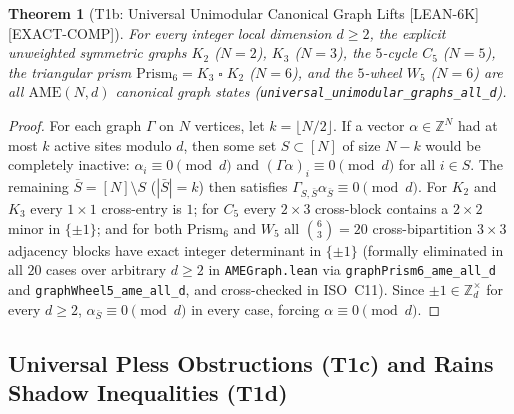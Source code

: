\documentclass[11pt,reqno]{amsart}
\newtheorem{theorem}{Theorem}[section]
\theoremstyle{definition}
\newcommand{\ZZ}{\mathbb{Z}}
\newcommand{\AME}{\mathrm{AME}}
\newcommand{\lid}[1]{{\footnotesize\nolinkurl{#1}}}
\newcommand{\tagL}{\textsf{\footnotesize[LEAN-6K]}}
\newcommand{\tagE}{\textsf{\footnotesize[EXACT-COMP]}}
\begin{document}
\begin{theorem}[T1b: Universal Unimodular Canonical Graph Lifts \tagL\,\tagE]
\label{thm:t1b}
For every integer local dimension $d \ge 2$, the explicit unweighted symmetric graphs
$K_2$ ($N=2$), $K_3$ ($N=3$), the $5$-cycle $C_5$ ($N=5$), the triangular prism
$\mathrm{Prism}_6 = K_3 \mathbin{\square} K_2$ ($N=6$), and the $5$-wheel $W_5$ ($N=6$)
are all $\AME(N, d)$ canonical graph states (\lid{universal_unimodular_graphs_all_d}).
\end{theorem}

\begin{proof}
For each graph $\Gamma$ on $N$ vertices, let $k = \lfloor N/2 \rfloor$. If a vector
$\alpha \in \ZZ^N$ had at most $k$ active sites modulo $d$, then some set $S \subset [N]$
of size $N - k$ would be completely inactive: $\alpha_i \equiv 0 \pmod d$ and
$(\Gamma\alpha)_i \equiv 0 \pmod d$ for all $i \in S$. The remaining $\bar{S} = [N]
\setminus S$ ($|\bar{S}| = k$) then satisfies $\Gamma_{S, \bar{S}} \alpha_{\bar{S}} \equiv
0 \pmod d$. For $K_2$ and $K_3$ every $1 \times 1$ cross-entry is $1$; for $C_5$ every
$2 \times 3$ cross-block contains a $2 \times 2$ minor in $\{\pm 1\}$; and for both
$\mathrm{Prism}_6$ and $W_5$ all $\binom{6}{3} = 20$ cross-bipartition $3 \times 3$
adjacency blocks have exact integer determinant in $\{\pm 1\}$ (formally eliminated in all
$20$ cases over arbitrary $d \ge 2$ in \lid{AMEGraph.lean} via \lid{graphPrism6_ame_all_d}
and \lid{graphWheel5_ame_all_d}, and cross-checked in ISO~C11). Since $\pm 1 \in \ZZ_d^\times$
for every $d \ge 2$, $\alpha_{\bar{S}} \equiv 0 \pmod d$ in every case, forcing
$\alpha \equiv 0 \pmod d$.
\end{proof}

\subsection{Universal Pless Obstructions (T1c) and Rains Shadow Inequalities (T1d)}
\end{document}
